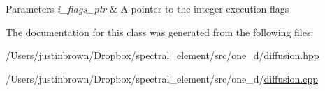  
\begin{DoxyParams}{Parameters}
{\em i\-\_\-flags\-\_\-ptr} & A pointer to the integer execution flags \\
\hline
\end{DoxyParams}


The documentation for this class was generated from the following files\-:\begin{DoxyCompactItemize}
\item 
/\-Users/justinbrown/\-Dropbox/spectral\-\_\-element/src/one\-\_\-d/\hyperlink{diffusion_8hpp}{diffusion.\-hpp}\item 
/\-Users/justinbrown/\-Dropbox/spectral\-\_\-element/src/one\-\_\-d/\hyperlink{diffusion_8cpp}{diffusion.\-cpp}\end{DoxyCompactItemize}
